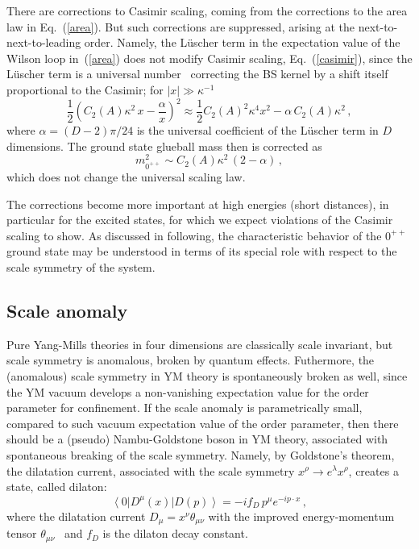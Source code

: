 \documentclass[prl,aps,
showpacs,
preprint,
nofootinbib,
floatfix,
superscriptaddress, showkeys
]{revtex4-1}
\begin{document}
There are corrections to Casimir scaling, coming from the corrections to the area law in Eq.~(\ref{area}). 
But such corrections are suppressed, arising at the next-to-next-to-leading order. 
Namely, the L\"uscher term in the expectation value of the Wilson loop in~(\ref{area}) does not modify  Casimir scaling, Eq.~(\ref{casimir}), 
since the L\"uscher term is a universal number~\cite{Luscher:1980fr} correcting the BS kernel by a shift itself
proportional to the Casimir; for $|x|\gg\kappa^{-1}$
\begin{equation}
\frac12\left( C_2(A)\kappa^2\,x-\frac{\alpha}{x}\right)^2\approx \frac12 C_2(A)^2\kappa^4x^2-\alpha\,C_2(A)\kappa^2\,,
\end{equation}
where $\alpha=(D-2)\pi/24$ is the universal coefficient of the L\"uscher term in $D$ dimensions. The ground state glueball mass then is corrected as
\begin{equation}
m_{0^{++}}^2\sim C_2(A)\kappa^2\,\left(2-\alpha\right)\,,
\end{equation}  
which does not change the universal scaling law.

The corrections  become more important at high energies (short distances), in particular for the excited states,
for which we expect violations of the Casimir scaling to show.
As discussed in following, the characteristic behavior of the $0^{++} $ ground state may be understood in terms of its special role 
with respect to the scale symmetry of the system. 

\subsection{Scale anomaly}
Pure Yang-Mills theories in four dimensions are classically scale invariant, but scale symmetry is anomalous, broken by quantum effects. 
Futhermore, the (anomalous) scale symmetry in YM theory is spontaneously broken as well, since the YM vacuum develops a non-vanishing expectation value for the order parameter for confinement.  If the scale anomaly is parametrically  small, compared to such vacuum expectation value of the order parameter, then there should be a (pseudo) Nambu-Goldstone boson in YM theory, associated with spontaneous breaking of the scale symmetry. 
Namely, by Goldstone's theorem, the dilatation current, associated with the scale symmetry $x^{\rho}\to e^{\lambda}x^{\rho}$, creates a state, called dilaton:
\begin{equation}
\left<0\right|D^{\mu}(x)\left|D(p)\right>=-if_D\,p^{\mu}e^{-ip\cdot x}\,,
\label{dilaton}
\end{equation}
where the dilatation current $D_{\mu}=x^{\nu}\theta_{\mu\nu}$ with the improved energy-momentum tensor $\theta_{\mu\nu}$~\cite{Callan:1970ze} and $f_D$ is the dilaton decay constant. 
\end{document}
